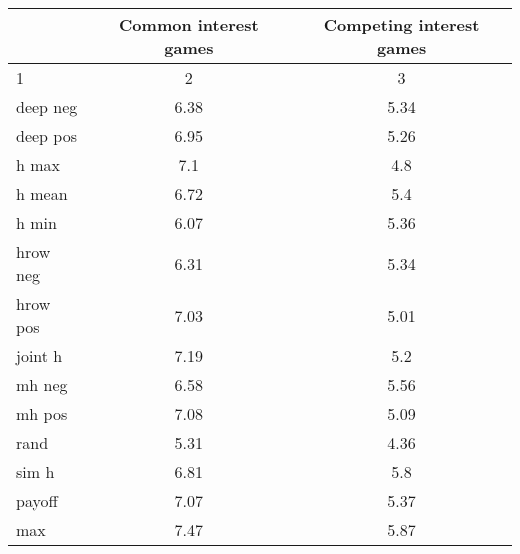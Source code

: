 \begin{tabular}{lcc}
\toprule 
 & Common interest games & Competing interest games \\
\midrule 
1 & 2 & 3 \\
\hline 
deep neg & 6.38 & 5.34 \\
deep pos & 6.95 & 5.26 \\
h max & 7.1 & 4.8 \\
h mean & 6.72 & 5.4 \\
h min & 6.07 & 5.36 \\
hrow neg & 6.31 & 5.34 \\
hrow pos & 7.03 & 5.01 \\
joint h & 7.19 & 5.2 \\
mh neg & 6.58 & 5.56 \\
mh pos & 7.08 & 5.09 \\
rand & 5.31 & 4.36 \\
sim h & 6.81 & 5.8 \\
payoff & 7.07 & 5.37 \\
\hline 
max & 7.47 & 5.87 \\
\bottomrule 
\end{tabular}
